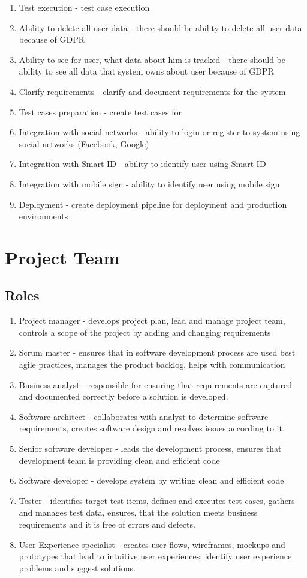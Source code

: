 \documentclass{VUMIFPSkursinis}
\begin{document}
\begin{enumerate}
		\item{Test execution} - test case execution
		\item{Ability to delete all user data} - there should be ability to delete all user data because of GDPR
		\item{Ability to see for user, what data about him is tracked} - there should be ability to see all data that system owns about user because of GDPR
		\item{Clarify requirements} - clarify and document requirements for the system
		\item{Test cases preparation} - create test cases for 
		\item{Integration with social networks} - ability to login or register to system using social networks (Facebook, Google)
		\item{Integration with Smart-ID} - ability to identify user using Smart-ID
		\item{Integration with mobile sign} - ability to identify user using mobile sign
		\item{Deployment} - create deployment pipeline for deployment and production environments
	\end{enumerate}

\section{Project Team}
	\subsection{Roles}
	\begin{enumerate}
		\item{Project manager} - develops project plan, lead and manage project team, controls a scope of the project by adding and changing requirements
		\item{Scrum master} - ensures that in software development process are used best agile practices, manages the product backlog, helps with communication
		\item{Business analyst} - responsible for ensuring that requirements are captured and documented correctly before a solution is developed.
		\item{Software architect} - collaborates with analyst to determine software requirements, creates software design and resolves issues according to it.
		\item{Senior software developer} - leads the development process, ensures that development team is providing clean and efficient code
		\item{Software developer} - develops system by writing clean and efficient code
		\item{Tester} - identifies target test items, defines and executes test cases, gathers and manages test data, ensures, that the solution meets business requirements and it is free of errors and defects.
		\item{User Experience specialist} - creates user flows, wireframes, mockups and prototypes that lead to intuitive user experiences; identify user experience problems and suggest solutions.
	\end{enumerate}
	
\end{document}
